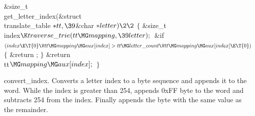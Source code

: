 \Y\B\1\1\&{size\_t} \\{get\_letter\_index}(\&{struct} \\{translate\_table}
${}{*}\\{tt},\39{}$\&{char} ${}{*}\\{letter})\2\2{}$\6
${}\{{}$\1\6
\&{size\_t} \\{index}${}\K\\{traverse\_trie}(\\{tt}\MG\\{mapping},\39%
\\{letter});{}$\7
\&{if} ${}(\\{index}\E\T{0}\V\\{tt}\MG\\{mapping}\MG\\{aux}[\\{index}]>\\{tt}%
\MG\\{letter\_count}\V\\{tt}\MG\\{mapping}\MG\\{aux}[\\{index}]\E\T{0}){}$\5
${}\{{}$\1\6
\&{return} ;\6
\4${}\}{}$\2\6
\&{return} \\{tt}${}\MG\\{mapping}\MG\\{aux}[\\{index}];{}$\6
\4${}\}{}$\2\par
\fi

convert\_index.
Converts a letter index to a byte sequence and appends it to the word.
While the index is greater than 254, appends 0xFF byte to the word and
subtracts 254 from the index. Finally appends the byte with the same
value as the remainder.

